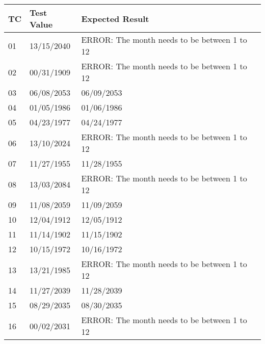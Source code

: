 \documentclass[11pt, oneside]{article}   	%
\begin{document}
\begin{table}[H]
\begin{tabular}{|l|l|l|}
\hline
TC & Test Value & Expected Result                              \\ \hline
01 & 13/15/2040 & ERROR: The month needs to be between 1 to 12 \\ \hline
02 & 00/31/1909 & ERROR: The month needs to be between 1 to 12 \\ \hline
03 & 06/08/2053 & 06/09/2053                                   \\ \hline
04 & 01/05/1986 & 01/06/1986                                   \\ \hline
05 & 04/23/1977 & 04/24/1977                                   \\ \hline
06 & 13/10/2024 & ERROR: The month needs to be between 1 to 12 \\ \hline
07 & 11/27/1955 & 11/28/1955                                   \\ \hline
08 & 13/03/2084 & ERROR: The month needs to be between 1 to 12 \\ \hline
09 & 11/08/2059 & 11/09/2059                                   \\ \hline
10 & 12/04/1912 & 12/05/1912                                   \\ \hline
11 & 11/14/1902 & 11/15/1902                                   \\ \hline
12 & 10/15/1972 & 10/16/1972                                   \\ \hline
13 & 13/21/1985 & ERROR: The month needs to be between 1 to 12 \\ \hline
14 & 11/27/2039 & 11/28/2039                                   \\ \hline
15 & 08/29/2035 & 08/30/2035                                   \\ \hline
16 & 00/02/2031 & ERROR: The month needs to be between 1 to 12 \\ \hline
\end{tabular}
\end{table}
\end{document}
